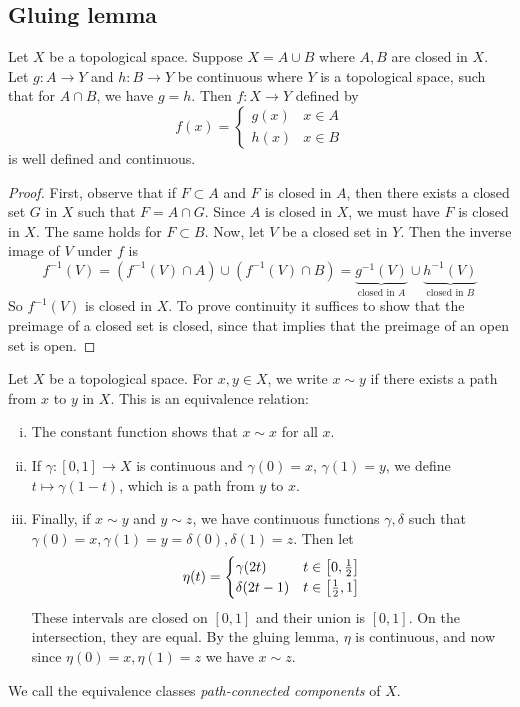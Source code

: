\subsection{Gluing lemma}
\begin{lemma}
	Let \( X \) be a topological space.
	Suppose \( X = A \cup B \) where \( A, B \) are closed in \( X \).
	Let \( g \colon A \to Y \) and \( h \colon B \to Y \) be continuous where \( Y \) is a topological space, such that for \( A \cap B \), we have \( g = h \).
	Then \( f \colon X \to Y \) defined by
	\[
		f(x) = \begin{cases}
			g(x) & x \in A \\
			h(x) & x \in B
		\end{cases}
	\]
	is well defined and continuous.
\end{lemma}
\begin{proof}
	First, observe that if \( F \subset A \) and \( F \) is closed in \( A \), then there exists a closed set \( G \) in \( X \) such that \( F = A \cap G \).
	Since \( A \) is closed in \( X \), we must have \( F \) is closed in \( X \).
	The same holds for \( F \subset B \).
	Now, let \( V \) be a closed set in \( Y \).
	Then the inverse image of \( V \) under \( f \) is
	\[
		f^{-1}(V) = (f^{-1}(V) \cap A) \cup (f^{-1}(V) \cap B) = \underbrace{g^{-1}(V)}_{\text{closed in } A} \cup \underbrace{h^{-1}(V)}_{\text{closed in } B}
	\]
	So \( f^{-1}(V) \) is closed in \( X \).
	To prove continuity it suffices to show that the preimage of a closed set is closed, since that implies that the preimage of an open set is open.
\end{proof}
\begin{definition}
	Let \( X \) be a topological space.
	For \( x, y \in X \), we write \( x \sim y \) if there exists a path from \( x \) to \( y \) in \( X \).
	This is an equivalence relation:
	\begin{enumerate}[(i)]
		\item The constant function shows that \( x \sim x \) for all \( x \).
		\item If \( \gamma \colon [0,1] \to X \) is continuous and \( \gamma(0) = x \), \( \gamma(1) = y \), we define \( t \mapsto \gamma(1-t) \), which is a path from \( y \) to \( x \).
		\item Finally, if \( x \sim y \) and \( y \sim z \), we have continuous functions \( \gamma, \delta \) such that \( \gamma(0) = x, \gamma(1) = y = \delta(0), \delta(1) = z \).
		      Then let
		      \[
			      \eta(t) = \begin{cases}
				      \gamma(2t)   & t \in \qty[0, \frac{1}{2}] \\
				      \delta(2t-1) & t \in \qty[\frac{1}{2}, 1]
			      \end{cases}
		      \]
		      These intervals are closed on \( [0,1] \) and their union is \( [0,1] \).
		      On the intersection, they are equal.
		      By the gluing lemma, \( \eta \) is continuous, and now since \( \eta(0) = x, \eta(1) = z \) we have \( x \sim z \).
	\end{enumerate}
	We call the equivalence classes \textit{path-connected components} of \( X \).
\end{definition}
